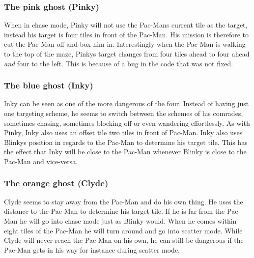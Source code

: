 \subsubsection*{The pink ghost (Pinky)}
When in chase mode, Pinky will not use the Pac-Mans current tile as the target, instead his target is four tiles in front of the Pac-Man. His mission is therefore to cut the Pac-Man off and box him in. Interestingly when the Pac-Man is walking to the top of the maze, Pinkys target changes from four tiles ahead to four ahead \textit{and} four to the left. This is because of a bug in the code that was not fixed.

\subsubsection*{The blue ghost (Inky)}
Inky can be seen as one of the more dangerous of the four. Instead of having just one targeting scheme, he seems to switch between the schemes of his comrades, sometimes chasing, sometimes blocking off or even wandering effortlessly. As with Pinky, Inky also uses an offset tile two tiles in front of Pac-Man. Inky also uses Blinkys position in regards to the Pac-Man to determine his target tile. This has the effect that Inky will be close to the Pac-Man whenever Blinky is close to the Pac-Man and vice-versa.

\subsubsection*{The orange ghost (Clyde)}
Clyde seems to stay away from the Pac-Man and do his own thing. He uses the distance to the Pac-Man to determine his target tile. If he is far from the Pac-Man he will go into chase mode just as Blinky would. When he comes within eight tiles of the Pac-Man he will turn around and go into scatter mode. While Clyde will never reach the Pac-Man on his own, he can still be dangerous if the Pac-Man gets in his way for instance during scatter mode.